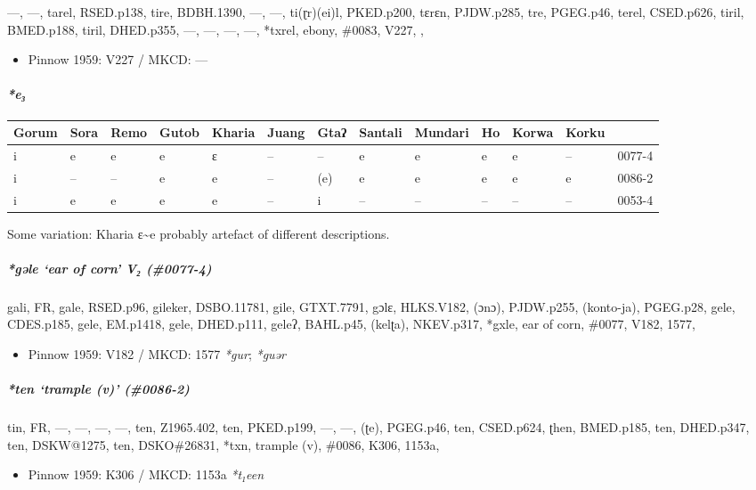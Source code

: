 \documentclass[a4paper,]{article}
\providecommand{\tightlist}{%
  \setlength{\itemsep}{0pt}\setlength{\parskip}{0pt}}
\let\oldparagraph\paragraph
\renewcommand{\paragraph}[1]{\oldparagraph{#1}\mbox{}}
\let\oldsubparagraph\subparagraph
\renewcommand{\subparagraph}[1]{\oldsubparagraph{#1}\mbox{}}
\begin{document}
---, ---, tarel, RSED.p138, tire, BDBH.1390, ---, ---, ti(ɽr)(ei)l,
PKED.p200, tɛrɛn, PJDW.p285, tre, PGEG.p46, terel, CSED.p626, tiril,
BMED.p188, tiril, DHED.p355, ---, ---, ---, ---, *txrel, ebony, \#0083,
V227, ,

\begin{itemize}
\tightlist
\item
  Pinnow 1959: V227 / MKCD: ---
\end{itemize}

\paragraph{\texorpdfstring{\emph{*e₃}}{*e₃}}\label{e-2}

\begin{longtable}[]{@{}lllllllllllll@{}}
\toprule
Gorum & Sora & Remo & Gutob & Kharia & Juang & Gtaʔ & Santali & Mundari
& Ho & Korwa & Korku &\tabularnewline
\midrule
\endhead
i & e & e & e & ɛ & -- & -- & e & e & e & e & -- & 0077-4\tabularnewline
i & -- & -- & e & e & -- & (e) & e & e & e & e & e &
0086-2\tabularnewline
i & e & e & e & e & -- & i & -- & -- & -- & -- & -- &
0053-4\tabularnewline
\bottomrule
\end{longtable}

Some variation: Kharia ɛ\textasciitilde{}e probably artefact of
different descriptions.

\subparagraph{\texorpdfstring{\emph{*gəle} `ear of corn' V₂
(\#0077-4)}{*gəle ear of corn V₂ (\#0077-4)}}\label{gux259le-ear-of-corn-v-0077-4}

gali, FR, gale, RSED.p96, gileker, DSBO.11781, gile, GTXT.7791, gɔlɛ,
HLKS.V182, (ɔnɔ), PJDW.p255, (konto-ja), PGEG.p28, gele, CDES.p185,
gele, EM.p1418, gele, DHED.p111, geleʔ, BAHL.p45, (kelʈa), NKEV.p317,
*gxle, ear of corn, \#0077, V182, 1577,

\begin{itemize}
\tightlist
\item
  Pinnow 1959: V182 / MKCD: 1577 \emph{*gur}; \emph{*guər}
\end{itemize}

\subparagraph{\texorpdfstring{\emph{*ten} `trample (v)'
(\#0086-2)}{*ten trample (v) (\#0086-2)}}\label{ten-trample-v-0086-2}

tin, FR, ---, ---, ---, ---, ten, Z1965.402, ten, PKED.p199, ---, ---,
(ʈe), PGEG.p46, ten, CSED.p624, ʈhen, BMED.p185, ten, DHED.p347, ten,
DSKW@1275, ten, DSKO\#26831, *txn, trample (v), \#0086, K306, 1153a,

\begin{itemize}
\tightlist
\item
  Pinnow 1959: K306 / MKCD: 1153a \emph{*t₁een}
\end{itemize}
\end{document}
